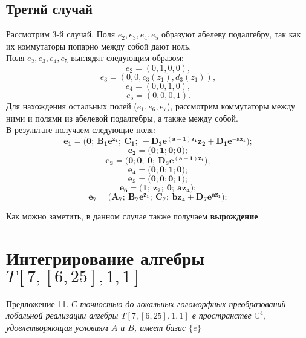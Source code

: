 \href{\href{}{}}{}\documentclass[14pt]{extarticle} %
\begin{document}
\subsection{Третий случай}

Рассмотрим 3-й случай. Поля \( e_2, e_3, e_4, e_5 \) образуют абелеву подалгебру, так как их коммутаторы попарно между собой дают ноль. \\

Поля \( e_2, e_3, e_4, e_5 \) выглядят следующим образом:
\[
e_2 = (0, 1, 0, 0),
\]
\[
e_3 = (0, 0, c_3(z_1), d_3(z_1)),
\]
\[
e_4 = (0, 0, 1, 0),
\]
\[
e_5 = (0, 0, 0, 1).
\]
Для нахождения остальных полей (\( e_1, e_6, e_7 \)), рассмотрим коммутаторы между ними и полями из абелевой подалгебры, а также между собой. \\

В результате получаем следующие поля:\\

\[
\boldsymbol{e_1 = \big( 0;\ B_1e^{z_1};\ C_1;\  -D_3e^{(a - 1)z_1}z_2 + D_1e^{-az_1}\big);}
\]
\[
\boldsymbol{e_2 = \big( 0; 1; 0; 0\big);}
\]
\[
\boldsymbol{e_3 = \big( 0; 0;\ 0;\ D_3e^{(a - 1)z_1} \big);}
\]
\[
\boldsymbol{e_4 = \big( 0; 0; 1; 0 \big);}
\]
\[
\boldsymbol{e_5 = \big( 0; 0; 0; 1 \big);}
\]
\[
\boldsymbol{e_6 = \big( 1;\ z_2;\ 0;\ az_4 \big);}
\]
\[
\boldsymbol{e_7 = \big( A_7;\ B_7e^{z_1};\ C_7;\ bz_4 + D_7e^{az_1} \big);}
\]

Как можно заметить, в данном случае также получаем \textbf{вырождение}.

\newpage
\section{Интегрирование алгебры $T [7, [6, 25], 1, 1]$}

Предложение 11. \textit{С точностью до локальных голоморфных преобразований лобальной реализации алгебры $T [7, [6, 25], 1, 1]$ в пространстве $\mathbb{C}^4$, удовлетворяющая условиям $A$ и $B$, имеет базис $\{e\}$}
\end{document}
